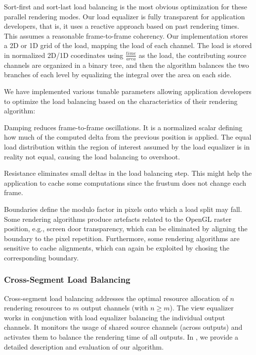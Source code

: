 \documentclass[journal]{vgtc}                %
\begin{document}
Sort-first and sort-last load balancing is the most obvious optimization for
these parallel rendering modes. Our load equalizer is fully transparent for
application developers, that is, it uses a reactive approach based on past
rendering times. This assumes a reasonable frame-to-frame coherency. Our
implementation stores a 2D or 1D grid of the load, mapping the load of each
channel. The load is stored in normalized 2D/1D coordinates using
$\frac{time}{area}$ as the load, the contributing source channels are organized
in a binary tree, and then the algorithm balances the two branches of each level
by equalizing the integral over the area on each side.

We have implemented various tunable parameters allowing application developers
to optimize the load balancing based on the characteristics of their rendering
algorithm:
\begin{compactdesc}
\item[Damping] reduces frame-to-frame oscillations. It is a normalized scalar
  defining how much of the computed delta from the previous position is
  applied. The equal load distribution within the region of interest assumed by
  the load equalizer is in reality not equal, causing the load balancing to
  overshoot.
\item[Resistance] eliminates small deltas in the load balancing step. This might
  help the application to cache some computations since the frustum does not
  change each frame.
\item[Boundaries] define the modulo factor in pixels onto which a load split may
  fall. Some rendering algorithms produce artefacts related to the OpenGL raster
  position, e.g., screen door transparency, which can be eliminated by aligning
  the boundary to the pixel repetition. Furthermore, some rendering algorithms
  are sensitive to cache alignments, which can again be exploited by chosing the
  corresponding boundary.
\end{compactdesc}

\subsubsection{Cross-Segment Load Balancing}

Cross-segment load balancing addresses the optimal resource allocation of $n$
rendering resources to $m$ output channels (with $n\geq m$). The view equalizer
works in conjunction with load equalizer balancing the individual output
channels. It monitors the usage of shared source channels (across outputs) and
activates them to balance the rendering time of all outputs. In \cite{EEP:11},
we provide a detailed description and evaluation of our algorithm.
\end{document}
